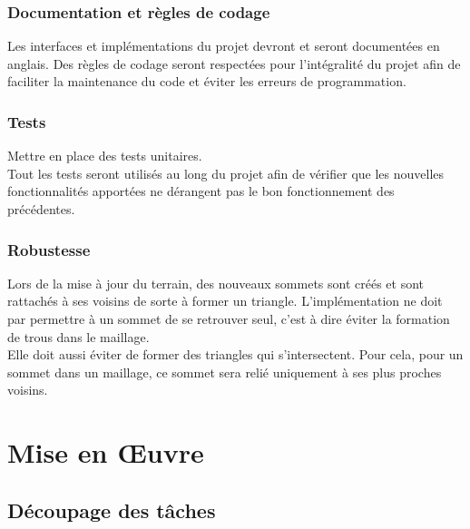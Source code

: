 \documentclass[12pt]{report}
\begin{document}
\newpage

\subsection{Documentation et règles de codage}

Les interfaces et implémentations du projet devront et seront
documentées en anglais. Des règles de codage seront respectées pour
l'intégralité du projet afin de faciliter la maintenance du code et
éviter les erreurs de programmation.



\subsection{Tests}

Mettre en place des tests unitaires.\\
Tout les tests seront utilisés au long du projet afin de vérifier que
les nouvelles fonctionnalités apportées ne dérangent pas le bon
fonctionnement des précédentes.

\subsection{Robustesse}

Lors de la mise à jour du terrain, des nouveaux sommets sont créés et
sont rattachés à ses voisins de sorte à former un triangle.
L'implémentation ne doit par permettre à un sommet de se retrouver seul,
c'est à dire éviter la formation de trous dans le maillage.\\
Elle doit aussi éviter de former des triangles qui s'intersectent. Pour
cela, pour un sommet dans un maillage, ce sommet sera relié uniquement à
ses plus proches voisins.

\newpage

\chapter*{Mise en Œuvre}
\setcounter{chapter}{4}


\section{Découpage des tâches}
\end{document}
